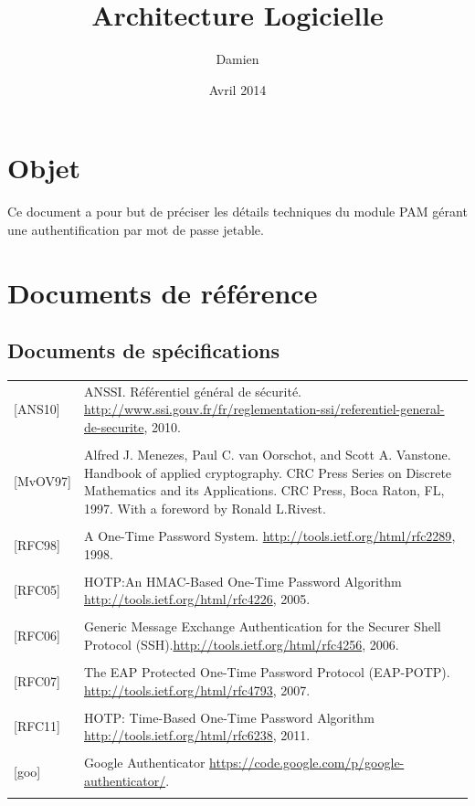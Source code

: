 \documentclass{"../../res/univ-projet"}
\title{Architecture Logicielle}
\author{Damien \bsc{Picard}}
\date{Avril 2014}
\begin{document}
\maketitle
\section{Objet}
Ce document a pour but de préciser les détails techniques du module PAM gérant une authentification
par mot de passe jetable.

\section{Documents de référence}
\subsection{Documents de spécifications}
\begin{tabular}{p{}>{\raggedright\arraybackslash}p{13cm}}
{[ANS10]} & {ANSSI. Référentiel général de sécurité. \href{http://www.ssi.gouv.fr/fr/reglementation-ssi/referentiel-general-de-securite}{http://www.ssi.gouv.fr/fr/reglementation-ssi/referentiel-general-de-securite}, 2010.}
\tabularnewline
\\
{[MvOV97]} & {Alfred J. Menezes, Paul C. van Oorschot, and Scott A. Vanstone. Handbook of applied cryptography. CRC Press Series on Discrete Mathematics and its Applications. CRC Press, Boca Raton, FL, 1997. With a foreword by Ronald L.Rivest.}
\tabularnewline
\\
{[RFC98]} & {A One-Time Password System. \href{http://tools.ietf.org/html/rfc2289}{http://tools.ietf.org/html/rfc2289}, 1998.}
\tabularnewline
\\
{[RFC05]} & {HOTP:An HMAC-Based One-Time Password Algorithm \href{http://tools.ietf.org/html/rfc4226}{http://tools.ietf.org/html/rfc4226}, 2005.}
\tabularnewline
\\
{[RFC06]} & {Generic Message Exchange Authentication for the Securer Shell Protocol (SSH).\href{http://tools.ietf.org/html/rfc4256}{http://tools.ietf.org/html/rfc4256}, 2006.}
\tabularnewline
\\
{[RFC07]} & {The EAP Protected One-Time Password Protocol (EAP-POTP). \href{http://tools.ietf.org/html/rfc4793}{http://tools.ietf.org/html/rfc4793}, 2007.}
\tabularnewline
\\
{[RFC11]} & {HOTP: Time-Based One-Time Password Algorithm \href{http://tools.ietf.org/html/rfc6238}{http://tools.ietf.org/html/rfc6238}, 2011.}
\tabularnewline
\\
{[goo]} & {Google Authenticator \href{https://code.google.com/p/google-authenticator/}{https://code.google.com/p/google-authenticator/}.}
\tabularnewline
\\
\end{tabular}
\end{document}
